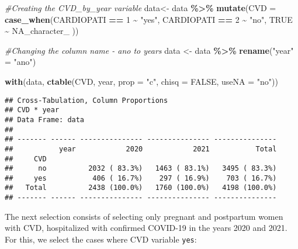 \documentclass[
]{article}
\newenvironment{Shaded}{\begin{snugshade}}{\end{snugshade}}
\newcommand{\AttributeTok}[1]{\textcolor[rgb]{0.13,0.29,0.53}{#1}}
\newcommand{\CommentTok}[1]{\textcolor[rgb]{0.56,0.35,0.01}{\textit{#1}}}
\newcommand{\ConstantTok}[1]{\textcolor[rgb]{0.56,0.35,0.01}{#1}}
\newcommand{\DecValTok}[1]{\textcolor[rgb]{0.00,0.00,0.81}{#1}}
\newcommand{\FunctionTok}[1]{\textcolor[rgb]{0.13,0.29,0.53}{\textbf{#1}}}
\newcommand{\NormalTok}[1]{#1}
\newcommand{\OtherTok}[1]{\textcolor[rgb]{0.56,0.35,0.01}{#1}}
\newcommand{\SpecialCharTok}[1]{\textcolor[rgb]{0.81,0.36,0.00}{\textbf{#1}}}
\newcommand{\StringTok}[1]{\textcolor[rgb]{0.31,0.60,0.02}{#1}}
\begin{document}
\begin{Shaded}
\begin{Highlighting}[]
\CommentTok{\#Creating the CVD\_by\_year variable}
\NormalTok{data}\OtherTok{\textless{}{-}}\NormalTok{ data }\SpecialCharTok{\%\textgreater{}\%} 
  \FunctionTok{mutate}\NormalTok{(}\AttributeTok{CVD =} \FunctionTok{case\_when}\NormalTok{(CARDIOPATI }\SpecialCharTok{==} \DecValTok{1} \SpecialCharTok{\textasciitilde{}} \StringTok{"yes"}\NormalTok{, CARDIOPATI }\SpecialCharTok{==} \DecValTok{2} \SpecialCharTok{\textasciitilde{}} \StringTok{"no"}\NormalTok{,   }\ConstantTok{TRUE} \SpecialCharTok{\textasciitilde{}} \ConstantTok{NA\_character\_}\NormalTok{ ))}

\CommentTok{\#Changing the column name {-} ano to years}
\NormalTok{data }\OtherTok{\textless{}{-}}\NormalTok{ data }\SpecialCharTok{\%\textgreater{}\%} 
    \FunctionTok{rename}\NormalTok{(}\StringTok{"year"} \OtherTok{=} \StringTok{"ano"}\NormalTok{)}

\FunctionTok{with}\NormalTok{(data, }\FunctionTok{ctable}\NormalTok{(CVD, year, }\AttributeTok{prop =} \StringTok{"c"}\NormalTok{, }\AttributeTok{chisq =} \ConstantTok{FALSE}\NormalTok{, }\AttributeTok{useNA =} \StringTok{"no"}\NormalTok{))}
\end{Highlighting}
\end{Shaded}

\begin{verbatim}
## Cross-Tabulation, Column Proportions  
## CVD * year  
## Data Frame: data  
## 
## ------- ------ --------------- --------------- ---------------
##           year            2020            2021           Total
##     CVD                                                       
##      no          2032 ( 83.3%)   1463 ( 83.1%)   3495 ( 83.3%)
##     yes           406 ( 16.7%)    297 ( 16.9%)    703 ( 16.7%)
##   Total          2438 (100.0%)   1760 (100.0%)   4198 (100.0%)
## ------- ------ --------------- --------------- ---------------
\end{verbatim}

The next selection consists of selecting only pregnant and postpartum
women with CVD, hospitalized with confirmed COVID-19 in the years 2020
and 2021. For this, we select the cases where CVD variable \texttt{yes}:
\end{document}
